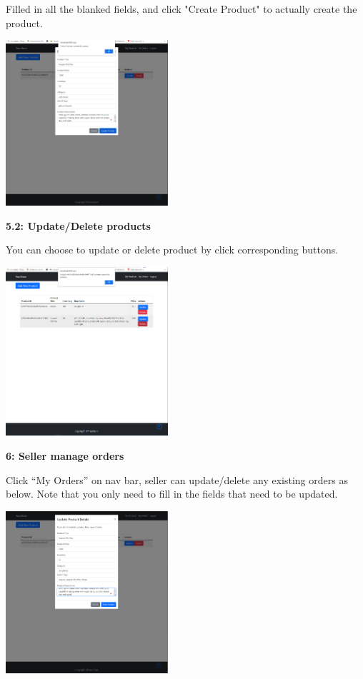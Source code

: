 \documentclass[12pt]{article}
\begin{document}
Filled in all the blanked fields, and click "Create Product" to actually create the product.

\includegraphics[width=0.45\textwidth]{UserGuideImage/9.png}

\vspace*{5mm}
\hspace*{5mm}\textbf{5.2: Update/Delete products}

You can choose to update or delete product by click corresponding buttons.

\includegraphics[width=0.45\textwidth]{UserGuideImage/10.png}

\newpage
\textbf{6: Seller manage orders}

Click “My Orders” on nav bar, seller can update/delete any existing orders as below.
Note that you only need to fill in the fields that need to be updated.

\includegraphics[width=0.45\textwidth]{UserGuideImage/11.png}
\end{document}
